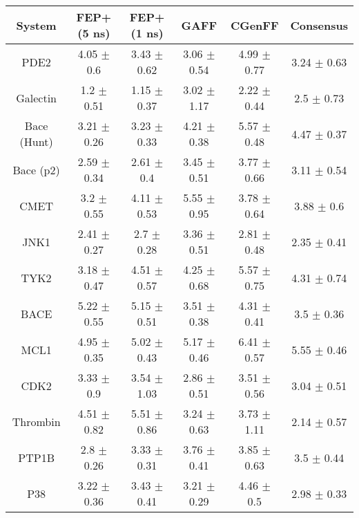 \begin{table}[h!]
{
\begin{tabular}{ c c c c c c}
System & FEP+ (5 ns) & FEP+ (1 ns) & GAFF & CGenFF & Consensus \\
\hline
PDE2 & 4.05 $\pm$ 0.6 & 3.43 $\pm$ 0.62 & 3.06 $\pm$ 0.54 & 4.99 $\pm$ 0.77 & 3.24 $\pm$ 0.63 \\
Galectin & 1.2 $\pm$ 0.51 & 1.15 $\pm$ 0.37 & 3.02 $\pm$ 1.17 & 2.22 $\pm$ 0.44 & 2.5 $\pm$ 0.73 \\
Bace (Hunt) & 3.21 $\pm$ 0.26 & 3.23 $\pm$ 0.33 & 4.21 $\pm$ 0.38 & 5.57 $\pm$ 0.48 & 4.47 $\pm$ 0.37 \\
Bace (p2) & 2.59 $\pm$ 0.34 & 2.61 $\pm$ 0.4 & 3.45 $\pm$ 0.51 & 3.77 $\pm$ 0.66 & 3.11 $\pm$ 0.54 \\
CMET & 3.2 $\pm$ 0.55 & 4.11 $\pm$ 0.53 & 5.55 $\pm$ 0.95 & 3.78 $\pm$ 0.64 & 3.88 $\pm$ 0.6 \\
JNK1 & 2.41 $\pm$ 0.27 & 2.7 $\pm$ 0.28 & 3.36 $\pm$ 0.51 & 2.81 $\pm$ 0.48 & 2.35 $\pm$ 0.41 \\
TYK2 & 3.18 $\pm$ 0.47 & 4.51 $\pm$ 0.57 & 4.25 $\pm$ 0.68 & 5.57 $\pm$ 0.75 & 4.31 $\pm$ 0.74 \\
BACE & 5.22 $\pm$ 0.55 & 5.15 $\pm$ 0.51 & 3.51 $\pm$ 0.38 & 4.31 $\pm$ 0.41 & 3.5 $\pm$ 0.36 \\
MCL1 & 4.95 $\pm$ 0.35 & 5.02 $\pm$ 0.43 & 5.17 $\pm$ 0.46 & 6.41 $\pm$ 0.57 & 5.55 $\pm$ 0.46 \\
CDK2 & 3.33 $\pm$ 0.9 & 3.54 $\pm$ 1.03 & 2.86 $\pm$ 0.51 & 3.51 $\pm$ 0.56 & 3.04 $\pm$ 0.51 \\
Thrombin & 4.51 $\pm$ 0.82 & 5.51 $\pm$ 0.86 & 3.24 $\pm$ 0.63 & 3.73 $\pm$ 1.11 & 2.14 $\pm$ 0.57 \\
PTP1B & 2.8 $\pm$ 0.26 & 3.33 $\pm$ 0.31 & 3.76 $\pm$ 0.41 & 3.85 $\pm$ 0.63 & 3.5 $\pm$ 0.44 \\
P38 & 3.22 $\pm$ 0.36 & 3.43 $\pm$ 0.41 & 3.21 $\pm$ 0.29 & 4.46 $\pm$ 0.5 & 2.98 $\pm$ 0.33 \\
\hline
\end{tabular}
}
\label{aue}
\end{table}
